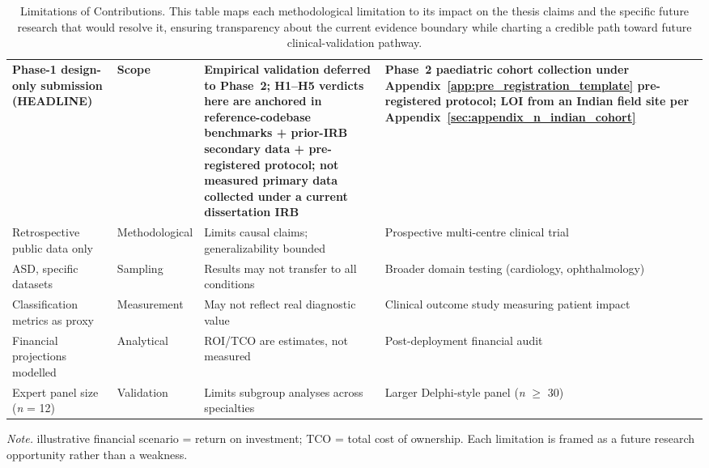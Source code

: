 \begin{table}[H]
\tablestripes\tablefontsize
\tablefontsize
\caption[Limitations of Contributions]{Limitations of Contributions. This table maps each methodological limitation to its impact on the thesis claims and the specific future research that would resolve it, ensuring transparency about the current evidence boundary while charting a credible path toward future clinical-validation pathway.}
\begin{tabularx}{\textwidth}{@{} >{\raggedright\arraybackslash}p{2.0cm} >{\raggedright\arraybackslash}p{1.6cm} L L @{}}
\toprule
{} &  &  &  \\
\midrule
\textbf{Phase-1 design-only submission (HEADLINE)} & \textbf{Scope} & \textbf{Empirical validation deferred to Phase~2; H1--H5 verdicts here are anchored in reference-codebase benchmarks + prior-IRB secondary data + pre-registered protocol; not measured primary data collected under a current dissertation IRB} & \textbf{Phase~2 paediatric cohort collection under Appendix~\ref{app:pre_registration_template} pre-registered protocol; LOI from an Indian field site per Appendix~\ref{sec:appendix_n_indian_cohort}} \\
\addlinespace
Retrospective public data only & Methodological & Limits causal claims; generalizability bounded & Prospective multi-centre clinical trial \\
\addlinespace
ASD, specific datasets & Sampling & Results may not transfer to all conditions & Broader domain testing (cardiology, ophthalmology) \\
\addlinespace
Classification metrics as proxy & Measurement & May not reflect real diagnostic value & Clinical outcome study measuring patient impact \\
\addlinespace
Financial projections modelled & Analytical & ROI/TCO are estimates, not measured & Post-deployment financial audit \\
\addlinespace
Expert panel size (\textit{n} = 12) & Validation & Limits subgroup analyses across specialties & Larger Delphi-style panel (\textit{n} $\geq$ 30) \\
\bottomrule
\end{tabularx}
\vspace{0.5em}\noindent\textit{Note.} illustrative financial scenario = return on investment; TCO = total cost of ownership. Each limitation is framed as a future research opportunity rather than a weakness.
\end{table}

